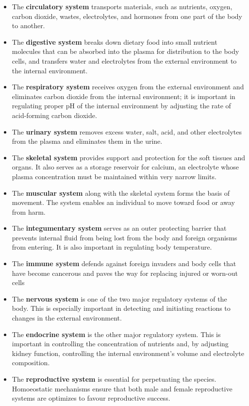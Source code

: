 \documentclass[11pt]{article}
\begin{document}
\begin{itemize}
\item The \textbf{circulatory system} transports materials, such as nutrients, oxygen, carbon dioxide, wastes, electrolytes, and hormones from one part of the body to another.
\item The \textbf{digestive system} breaks down dietary food into small nutrient molecules that can be absorbed into the plasma for distribution to the body cells, and transfers water and electrolytes from the external environment to the internal environment.
\item The \textbf{respiratory system} receives oxygen from the external environment and eliminates carbon dioxide from the internal environment; it is important in regulating proper pH of the internal environment by adjusting the rate of acid-forming carbon dioxide. 
\item The \textbf{urinary system} removes excess water, salt, acid, and other electrolytes from the plasma and eliminates them in the urine.
\item The \textbf{skeletal system} provides support and protection for the soft tissues and organs. It also serves as a storage reservoir for calcium, an electrolyte whose plasma concentration must be maintained within very narrow limits.
\item The \textbf{muscular system} along with the skeletal system forms the basis of movement. The system enables an individual to move toward food or away from harm.
\item The \textbf{integumentary system} serves as an outer protecting barrier that prevents internal fluid from being lost from the body and foreign organisms from entering. It is also important in regulating body temperature.
\item The \textbf{immune system} defends against foreign invaders and body cells that have become cancerous and paves the way for replacing injured or worn-out cells
\item The \textbf{nervous system} is one of the two major regulatory systems of the body. This is especially important in detecting and initiating reactions to changes in the external environment. 
\item The \textbf{endocrine system} is the other major regulatory system. This is important in controlling the concentration of nutrients and, by adjusting kidney function, controlling the internal environment's volume and electrolyte composition.
\item The \textbf{reproductive system} is essential for perpetuating the species. Homoeostatic mechanisms ensure that both male and female reproductive systems are optimizes to favour reproductive success. 

\end{itemize}
\end{document}
